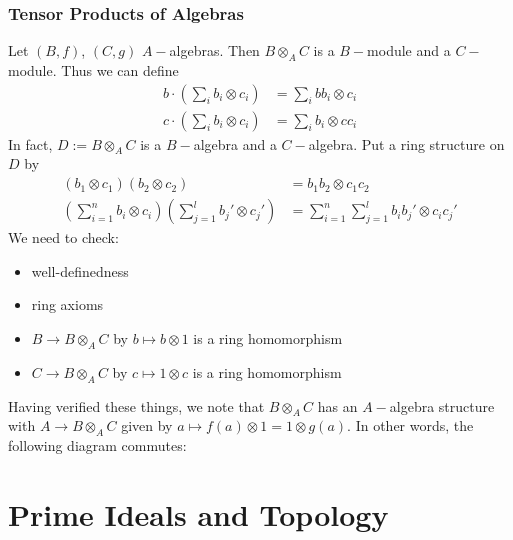 \documentclass[11pt, a4paper]{memoir}
\theoremstyle{change}
\theoremstyle{plain}
\theoremstyle{nonumberplain}
\DeclareMathOperator{\id}{id}
\numberwithin{equation}{section}
\begin{document}
\subsection{Tensor Products of Algebras}
Let $(B,f)$, $(C,g)$ $A-$algebras.
Then $B\otimes_A C$ is a $B-$module and a $C-$module.
Thus we can define
\begin{align*}
    b\cdot\left(\sum_i b_i\otimes c_i\right)&=\sum_i bb_i\otimes c_i\\
    c\cdot\left(\sum_i b_i\otimes c_i\right)&=\sum_i b_i\otimes cc_i
\end{align*}
In fact, $D:= B\otimes_A C$ is a $B-$algebra and a $C-$algebra.
Put a ring structure on $D$ by
\begin{align*}
    (b_1\otimes c_1)(b_2\otimes c_2)&=b_1b_2\otimes c_1c_2\\
    \left(\sum_{i=1}^nb_i\otimes c_i\right)\left(\sum_{j=1}^l b_j'\otimes c_j'\right)&=\sum_{i=1}^n\sum_{j=1}^l b_ib_j'\otimes c_ic_j'
\end{align*}
We need to check:
\begin{itemize}[nolistsep]
    \item well-definedness
    \item ring axioms
    \item $B\to B\otimes_A C$ by $b\mapsto b\otimes 1$ is a ring homomorphism
    \item $C\to B\otimes_A C$ by $c\mapsto 1\otimes c$ is a ring homomorphism
\end{itemize}
Having verified these things, we note that $B\otimes_A C$ has an $A-$algebra structure with $A\to B\otimes_A C$ given by $a\mapsto f(a)\otimes 1=1\otimes g(a)$.
In other words, the following diagram commutes:
\begin{center}
\end{center}
\chapter{Prime Ideals and Topology}
\end{document}
